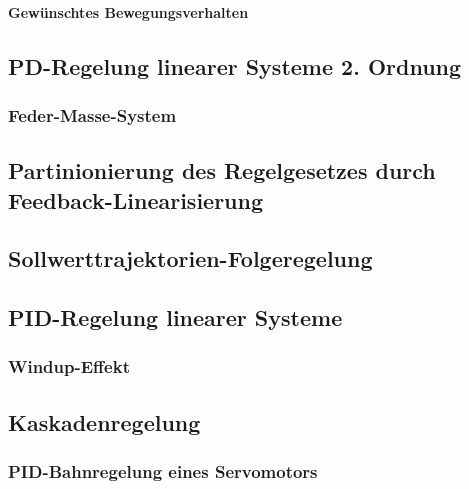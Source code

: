\documentclass[a4paper, 11pt, accentcolor = tud3b]{tudreport}
\begin{document}
					\paragraph{Gewünschtes Bewegungsverhalten} %

			\subsection{PD-Regelung linearer Systeme 2. Ordnung} %

				\subsubsection{Feder-Masse-System} %

			\subsection{Partinionierung des Regelgesetzes durch Feedback-Linearisierung} %

			\subsection{Sollwerttrajektorien-Folgeregelung} %

			\subsection{PID-Regelung linearer Systeme} %

				\subsubsection{Windup-Effekt} %

			\subsection{Kaskadenregelung} %

				\subsubsection{PID-Bahnregelung eines Servomotors} %
\end{document}
